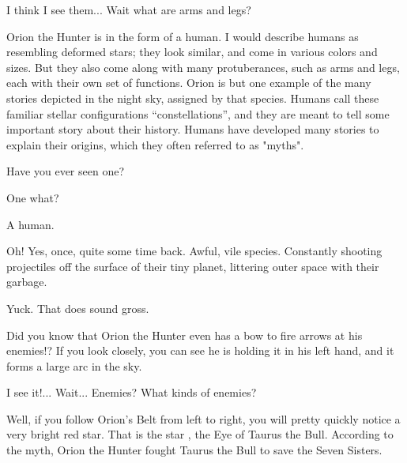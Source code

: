 \documentclass[main.tex]{subfiles}
\begin{document}
\par \Maia I think I see them... Wait what are arms and legs?  

\par \Pleione Orion the Hunter is in the form of a human.  I would describe humans as resembling deformed stars; they look similar, and come in various colors and sizes.  But they also come along with many protuberances, such as arms and legs, each with their own set of functions.   Orion is but one example of the many stories depicted in the night sky, assigned by that species.  Humans call these familiar stellar configurations ``constellations'', and they are meant to tell some important story about their history.  Humans have developed many stories to explain their origins, which they often referred to as "myths".

\par \Maia Have you ever seen one?

\par \Pleione One what?

\par \Maia A human.

\par \Pleione Oh!  Yes, once, quite some time back.  Awful, vile species.  Constantly shooting projectiles off the surface of their tiny planet, littering outer space with their garbage.

\par \Maia Yuck.  That does sound gross.  

\par \Pleione Did you know that Orion the Hunter even has a bow to fire arrows at his enemies!?  If you look closely, you can see he is holding it in his left hand, and it forms a large arc in the sky.

\par \Maia I see it!... Wait... Enemies?  What kinds of enemies?

\par \Pleione Well, if you follow Orion's Belt from left to right, you will pretty quickly notice a very bright red star.  That is the star \rmaldebarran, the Eye of Taurus the Bull.  According to the myth, Orion the Hunter fought Taurus the Bull to save the Seven Sisters.  
\end{document}
